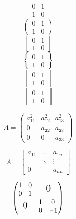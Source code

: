 \documentclass{ctexart}
\begin{document}
    \[
        \begin{matrix}
            0 & 1 \\
            1 & 0
        \end{matrix}
    \]
    \[
    \begin{pmatrix}
        0 & 1 \\
        1 & 0
    \end{pmatrix}
    \]
    \[
    \begin{bmatrix}
        0 & 1 \\
        1 & 0
    \end{bmatrix}
    \]
    \[
    \begin{Bmatrix}
        0 & 1 \\
        1 & 0
    \end{Bmatrix}
    \]
    \[
    \begin{vmatrix}
        0 & 1 \\
        1 & 0
    \end{vmatrix}
    \]
    \[
    \begin{Vmatrix}
        0 & 1 \\
        1 & 0
    \end{Vmatrix}
    \]


    \[
    A = \begin{pmatrix}
        a_{11}^2 & a_{12}^2 & a_{13}^2 \\
        0 & a_{22} & a_{23} \\
        0 & 0 & a_{33}
    \end{pmatrix}  
    \]

    \[
        A=\begin{bmatrix}
            a_{11} & \dots & a_{1n} \\
             & \ddots & \vdots \\
            0 & & a_{nn} 
        \end{bmatrix}\]
    
    \[
        \begin{pmatrix}
            \begin{matrix}
                1&0\\0&1
            \end{matrix} & \text{\Large 0} \\
            \text{\Large 0} & \begin{matrix}
                1&0\\0&-1
            \end{matrix}
        \end{pmatrix}\]
\end{document}
